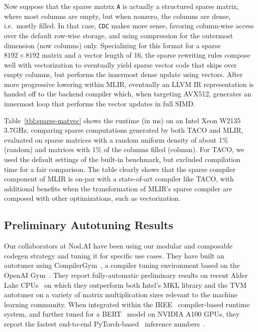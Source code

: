 Now suppose that the sparse matrix \texttt{A} is actually a structured sparse matrix, where most columns are empty, but when nonzero, the columns are dense, i.e.\ mostly filled. In that case, \texttt{CDC} makes more sense, favoring column-wise access over the default row-wise storage, and using compression for the outermost dimension (now columns) only. Specializing for this format for a sparse $8192 \times 8192$ matrix and a vector length of 16, the sparse rewriting rules compose well with vectorization to eventually yield sparse vector code that skips over empty columns, but performs the innermost dense update using vectors. After more progressive lowering within MLIR, eventually an LLVM IR representation is handed off to the backend compiler which, when targeting AVX512, generates an innermost loop that performs the vector updates in full SIMD.

Table~\ref{tbl:sparse-matvec} shows the runtime (in ms) on an Intel Xeon W2135 $3.7\mathrm{GHz}$, comparing sparse computations generated by both TACO and MLIR, evaluated on sparse matrices with a random uniform density of about 1\% (random) and matrices with 1\% of the columns filled (column). For TACO, we used the default settings of the built-in benchmark, but excluded compilation time for a fair comparison. The table clearly shows that the sparse compiler component of MLIR is on-par with a state-of-art compiler like TACO, with additional benefits when the transformation of MLIR's sparse compiler are composed with other optimizations, such as vectorization.

\subsection{Preliminary Autotuning Results}
\label{subsec:prelim-tuning-results}

Our collaborators at Nod.AI have been using our modular and composable codegen strategy and tuning it for specific use cases. 
They have built an autotuner using CompilerGym~\cite{CompilerGym}, a compiler tuning environment based on the OpenAI Gym~\cite{OpenAIGym}.
They report fully-automatic preliminary results on recent Alder Lake CPUs~\cite{NodeAi-tuner} on which they outperform both Intel's MKL library and the TVM autotuner on a variety of matrix multiplication sizes relevant to the machine learning community.
When integrated within the IREE~\cite{iree} compiler-based runtime system, and further tuned for a BERT~\cite{Bert} model on NVIDIA A100 GPUs, they report the fastest end-to-end PyTorch-based~\cite{PyTorch} inference numbers~\cite{NodeAi-runtime}.
